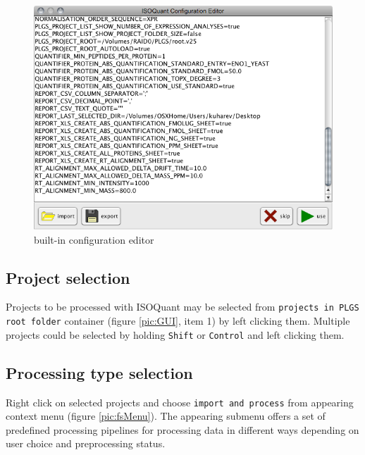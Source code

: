 \documentclass[]{article}
\makeatletter
\def\maxwidth{\ifdim\Gin@nat@width>\linewidth\linewidth
\else\Gin@nat@width\fi}
\let\Oldincludegraphics\includegraphics
\renewcommand{\includegraphics}[1]{\Oldincludegraphics[width=\maxwidth]{#1}}
\makeatother
\begin{document}
\begin{figure}[htbp]
\centering
\includegraphics{assets/isoquant/pics/configuration_editor.png}
\caption{built-in configuration editor \label{pic:cfgEditor}}
\end{figure}

\subsection{Project selection}

Projects to be processed with ISOQuant may be selected from
\lstinline!projects in PLGS root folder! container (figure
\ref{pic:GUI}, item 1) by left clicking them. Multiple projects could be
selected by holding \lstinline!Shift! or \lstinline!Control! and left
clicking them.

\subsection{Processing type selection}

Right click on selected projects and choose
\lstinline!import and process! from appearing context menu (figure
\ref{pic:fsMenu}). The appearing submenu offers a set of predefined
processing pipelines for processing data in different ways depending on
user choice and preprocessing status.
\end{document}
